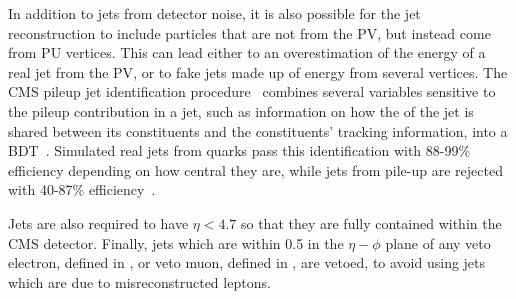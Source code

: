 In addition to jets from detector noise, it is also possible for the jet reconstruction to include particles that are not from the \ac{PV}, but instead come from \ac{PU} vertices. This can lead either to an overestimation of the energy of a real jet from the \ac{PV}, or to fake jets made up of energy from several vertices. The CMS pileup jet identification procedure~\cite{CMS-PAS-JME-13-005} combines several variables sensitive to the pileup contribution in a jet, such as information on how the \pt of the jet is shared between its constituents and the constituents' tracking information, into a \ac{BDT}~\cite{TMVA}. Simulated real jets from quarks pass this identification with 88-99\% efficiency depending on how central they are, while jets from pile-up are rejected with 40-87\% efficiency~\cite{CMS-PAS-JME-13-005}.

Jets are also required to have $\eta<4.7$ so that they are fully contained within the CMS detector. Finally, jets which are within 0.5 in the $\eta-\phi$ plane of any veto electron, defined in , or veto muon, defined in , are vetoed, to avoid using jets which are due to misreconstructed leptons.

